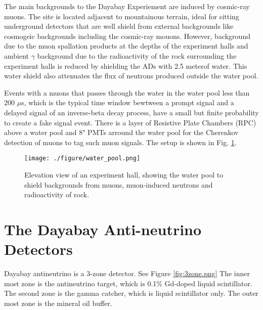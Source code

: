 The main backgrounds to the Dayabay Experiement are induced by cosmic-ray muons.
The site is located adjacent to mountainous terrain, ideal for sitting underground detectors that
are well shield from external backgrounds like cosmogeic backgrounds including the cosmic-ray mouons.
However, background due to the muon spallation products at the depths of the experiment halls and ambient
$\gamma$ background due to the radioactivity of the rock surrounding the experiment halls is reduced by shielding
the ADs with 2.5 meterof water. This water shield also attenuates the flux of neutrons produced outside the water
pool.

Events with a muons that passes through the water in the water pool less than 200 $\mu$s, which is the typical time window bewtween
a prompt signal and a delayed signal of an inverse-beta decay process, have a small but finite
probability to create a fake signal event.
There is a layer of  Resistive Plate Chambers (RPC) above a water pool
and 8" PMTs arround the water pool for the Cherenkov detection of muons to tag such muon signals.
The setup is shown in Fig. \ref{fig:water_pool.png}.


\begin{figure}
    \centering
    \texttt{[image: ./figure/water\_pool.png]}
    \caption{Elevation view of an experiment hall,
showing the water pool to shield backgrounds from muons, muon-induced neutrons and radioactivity of rock.}
    \label{fig:water_pool.png}
    \end{figure}







\section{The Dayabay Anti-neutrino Detectors}
\label{sec:AD}

Dayabay antineutrino is a 3-zone detector. See Figure \ref{fig:3zone.png}
The inner most zone is the antineutrino target, which
is 0.1\% Gd-doped liquid scintillator. The second zone
is the gamma catcher, which is liquid scintillator only.
The outer most zone is the mineral oil buffer.


